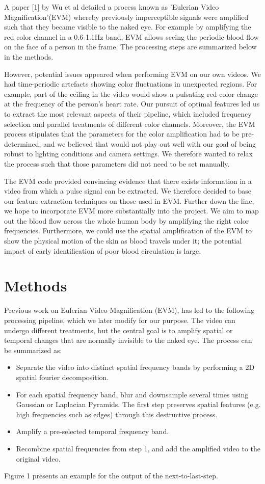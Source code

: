 \documentclass[12pt]{article}
\begin{document}
A paper [1] by Wu et al detailed a process known as 'Eulerian Video Magnification'(EVM) whereby previously imperceptible signals were amplified such that they became visible to the naked eye. For example by amplifying the red color channel in a 0.6-1.1Hz band, EVM allows seeing the periodic blood flow on the face of a person in the frame. The processing steps are summarized below in the methods.

However, potential issues appeared when performing EVM on our own videos. We had time-periodic artefacts showing color fluctuations in unexpected regions. For example, part of the ceiling in the video would show a pulsating red color change at the frequency of the person's heart rate. Our pursuit of optimal features led us to extract the most relevant aspects of their pipeline, which included frequency selection and parallel treatments of different color channels. Moreover, the EVM process stipulates that the parameters for the color amplification had to be pre-determined, and we believed that would not play out well with our goal of being robust to lighting conditions and camera settings. We therefore wanted to relax the process such that those parameters did not need to be set manually.

The EVM code provided convincing evidence that there exists information in a video from which a pulse signal can be extracted. We therefore decided to base our feature extraction techniques on those used in EVM. Further down the line, we hope to incorporate EVM more substantially into the project. We aim to map out the blood flow across the whole human body by amplifying the right color frequencies. Furthermore, we could use the spatial amplification of the EVM to show the physical motion of the skin as blood travels under it; the potential impact of early identification of poor blood circulation is large.


\section{Methods}

Previous work on Eulerian Video Magnification (EVM), has led to the following processing pipeline, which we later modify for our purpose. The video can undergo different treatments, but the central goal is to amplify spatial or temporal changes that are normally invisible to the naked eye. The process can be summarized as:

\begin{itemize}
\item Separate the video into distinct spatial frequency bands by performing a 2D spatial fourier decomposition. 
\item For each spatial frequency band, blur and downsample several times using Gaussian or Laplacian Pyramids. The first step preserves spatial features (e.g. high frequencies such as edges) through this destructive process.
\item Amplify a pre-selected temporal frequency band.
\item Recombine spatial frequencies from step 1, and add the amplified video to the original video.
\end{itemize}
Figure 1 presents an example for the output of the next-to-last-step. 
\end{document}

